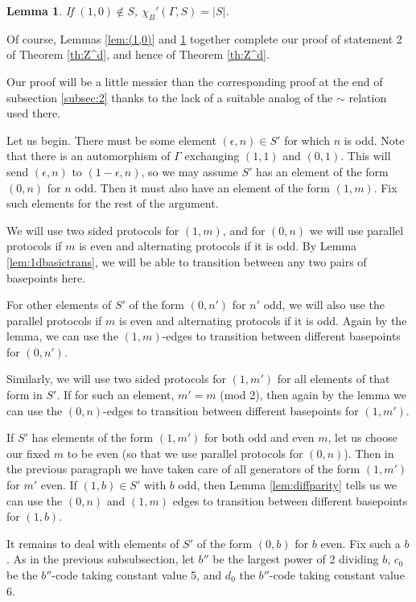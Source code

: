 \documentclass[12pt]{article}
\newcommand{\0}{\varnothing}
\newtheorem{lemma}{Lemma}
\begin{document}
\begin{lemma}\label{lem:no(1,0)}
If $(1,0) \notin S$, $\chi_B'(\Gamma,S) = |S|$.
\end{lemma}

Of course, Lemmas \ref{lem:(1,0)} and \ref{lem:no(1,0)} together complete our proof of statement 2 of Theorem \ref{th:Z^d}, and hence of Theorem \ref{th:Z^d}.

Our proof will be a little messier than the corresponding proof at the end of subsection \ref{subsec:2} thanks to the lack of a suitable analog of the $\sim$ relation used there.

Let us begin. There must be some element $(\epsilon,n) \in S'$ for which $n$ is odd. Note that there is an automorphism of $\Gamma$ exchanging $(1,1)$ and $(0,1)$. This will send $(\epsilon,n)$ to $(1-\epsilon,n)$, so we may assume $S'$ has an element of the form $(0,n)$ for $n$ odd. Then it must also have an element of the form $(1,m)$. Fix such elements for the rest of the argument.

We will use two sided protocols for $(1,m)$, and for $(0,n)$ we will use parallel protocols if $m$ is even and alternating protocols if it is odd.
By Lemma \ref{lem:1dbasictrans}, we will be able to transition between any two pairs of basepoints here.

For other elements of $S'$ of the form $(0,n')$ for $n'$ odd, we will also use the parallel protocols if $m$ is even and alternating protocols if it is odd. Again by the lemma, we can use the $(1,m)$-edges to transition between different basepoints for $(0,n')$.

Similarly, we will use two sided protocols for $(1,m')$ for all elements of that form in $S'$. If for such an element, $m' = m$ (mod 2), then again by the lemma we can use the $(0,n)$-edges to transition between different basepoints for $(1,m')$.

If $S'$ has elements of the form $(1,m')$ for both odd and even $m$, let us choose our fixed $m$ to be even (so that we use parallel protocols for $(0,n)$). Then in the previous paragraph we have taken care of all generators of the form $(1,m')$ for $m'$ even. If $(1,b) \in S'$ with $b$ odd, then Lemma \ref{lem:diffparity} tells us we can use the $(0,n)$ and $(1,m)$ edges to transition between different basepoints for $(1,b)$.

It remains to deal with elements of $S'$ of the form $(0,b)$ for $b$ even. Fix such a $b$. As in the previous subsubsection, let $b''$ be the largest power of 2 dividing $b$, $c_0$ be the $b''$-code taking constant value 5, and $d_0$ the $b''$-code taking constant value 6.
\end{document}
